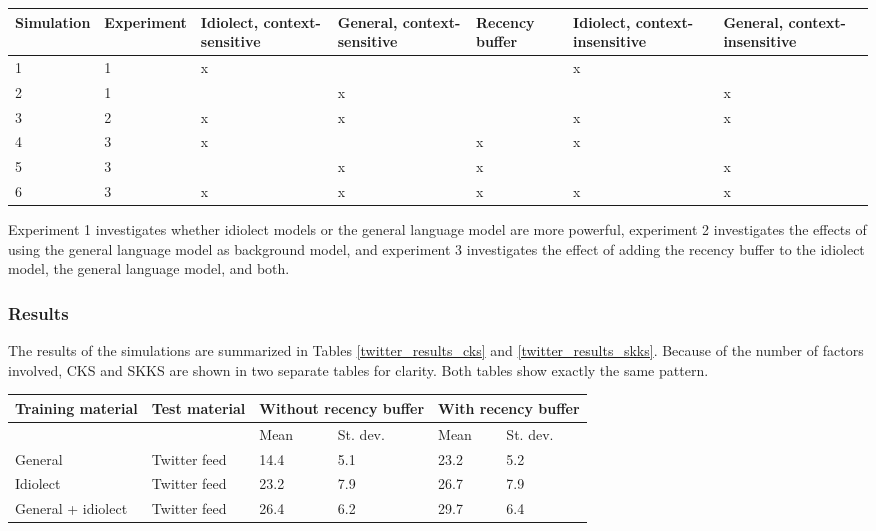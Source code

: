 \documentclass[11pt]{article}
\let\originaltable\table
\let\endoriginaltable\endtable
\renewenvironment{table}[1][ht]{%
  \originaltable[#1]
  \centering}%
  {\endoriginaltable}
\begin{document}
\begin{table}[H] \footnotesize
\begin{tabular}{l|l|p{1.2cm}p{1.2cm}p{1.2cm}p{1.2cm}p{1.2cm}} 
Simulation&Experiment&Idiolect, context-sensitive&General, context-sensitive&Recency buffer&Idiolect, context-insensitive&General, context-insensitive\\
\hline
1&1&x&&&x&\\
2&1&&x&&&x\\

3&2&x&x&&x&x\\

4&3&x&&x&x&\\
5&3&&x&x&&x\\
6&3&x&x&x&x&x\\

\end{tabular} 
\caption{Overview of all module set-ups} 
\end{table}

Experiment 1 investigates whether idiolect models or the general language model are more powerful, experiment 2 investigates the effects of using the general language model as background model, and experiment 3 investigates the effect of adding the recency buffer to the idiolect model, the general language model, and both.

\subsubsection{Results}

The results of the simulations are summarized in Tables \ref{twitter_results_cks} and \ref{twitter_results_skks}. Because of the number of factors involved, CKS and SKKS are shown in two separate tables for clarity. Both tables show exactly the same pattern.

\begin{table}[H] 
\centering
\begin{tabular}{ll|llll} 
Training material&Test material&\multicolumn{2}{l}{Without recency buffer}&\multicolumn{2}{l}{With recency buffer}\\
\hline
&&Mean&St. dev.&Mean&St. dev.\\
General&Twitter feed&14.4&5.1&23.2&5.2\\
Idiolect&Twitter feed&23.2&7.9&26.7&7.9\\
General + idiolect&Twitter feed&26.4&6.2&29.7&6.4\\
\end{tabular} 
\caption{Mean percentage of keystrokes saved (\textbf{CKS}) and standard deviations for all module set-ups.} \label{twitter_results_cks}
\end{table}
\end{document}

